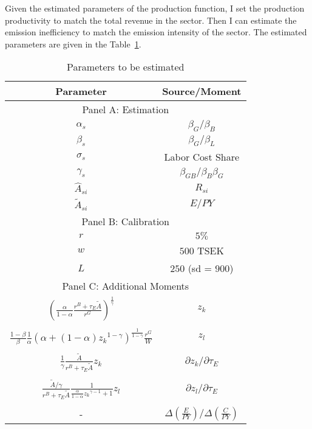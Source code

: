 Given the estimated parameters of the production function, I set the production productivity to match the total revenue in the sector. Then I can estimate the emission inefficiency to match the emission intensity of the sector. The estimated parameters are given in the Table~\ref{tab:estimate_parameters}.

\begin{table}[http]
    \centering
    \caption{\quad Parameters to be estimated} \label{tab:estimate_parameters}
    \vspace*{2mm}
    \begin{tabular}{@{}cc@{}}
    \toprule
    \textbf{Parameter}  & \textbf{Source/Moment}\\
    \midrule 
    \multicolumn{2}{c}{Panel A: Estimation} \\
    \midrule
    $\alpha_s$ & ${\beta_G}/{\beta_B}$ \\
    $\beta_s$ & ${\beta_G}/{\beta_L}$\\ 
    $\sigma_s$ & Labor Cost Share\\
    $\gamma_s$ & ${\beta_{GB}}/{\beta_B\beta_G}$\\
    $\hat{A}_{si}$ & $R_{si}$\\
    $\tilde{A}_{si}$ & $E/PY$\\
    \midrule
    \multicolumn{2}{c}{Panel B: Calibration} \\
    \midrule
    $r$ & $5\%$  \\
    $w$ & $500$ TSEK  \\
    $L$ & $250$ (sd = $900$) \cite{martinsson2024effect}  \\
    \midrule
    \multicolumn{2}{c}{Panel C: Additional Moments} \\
    \midrule
    $ \left(
            \frac{\alpha}{1-\alpha} \frac{r^B + {\tau_E}\tilde{A}}{r^G}
        \right) ^{\frac{1}{\gamma}}$ & $z_k$ \\\\
    $\frac{1-\beta}{\beta}\frac{1}{\alpha}\left(
        \alpha + (1-\alpha) {{z_k}}^{1-\gamma}
    \right)^{\frac{1}{1-\gamma}} \frac{r^G}{W}$ & $z_l$ \\\\
    $\frac{1}{\gamma} \frac{\tilde{A}}{r^B + \tau_E\tilde{A}} z_k$ & ${\partial z_k/\partial \tau_E }$ \\\\
    $\frac{\tilde{A}/\gamma}{r^B + \tau_E\tilde{A}}\frac{1}{\frac{\alpha}{1-\alpha}{{z_k}}^{\gamma-1} + 1}{z_l}$ &   $\partial z_l/\partial \tau_E$\\\\
    - & $\Delta(\frac{E}{PY})/\Delta(\frac{C}{PY}) $ \\
    \bottomrule
\end{tabular}
\end{table}





